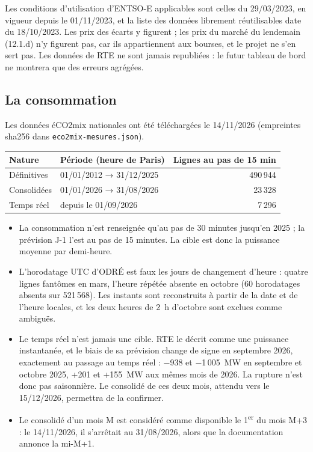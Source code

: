 \documentclass[11pt,a4paper]{article}
\begin{document}
Les conditions d'utilisation d'ENTSO-E applicables sont celles du 29/03/2023, en vigueur depuis le 01/11/2023, et la liste des données librement réutilisables date du 18/10/2023. Les prix des écarts y figurent ; les prix du marché du lendemain (12.1.d) n'y figurent pas, car ils appartiennent aux bourses, et le projet ne s'en sert pas. Les données de RTE ne sont jamais republiées : le futur tableau de bord ne montrera que des erreurs agrégées.

\subsection{La consommation}

Les données éCO2mix nationales ont été téléchargées le 14/11/2026 (empreintes sha256 dans \nolinkurl{eco2mix-mesures.json}).

\begin{table}[H]
\small
\begin{tabularx}{\linewidth}{lYr}
\toprule
\textbf{Nature} & \textbf{Période (heure de Paris)} & \textbf{Lignes au pas de 15 min} \\
\midrule
Définitives & 01/01/2012 → 31/12/2025 & 490\,944 \\
Consolidées & 01/01/2026 → 31/08/2026 & 23\,328 \\
Temps réel & depuis le 01/09/2026 & 7\,296 \\
\bottomrule
\end{tabularx}
\end{table}

\begin{itemize}
  \item La consommation n'est renseignée qu'au pas de 30 minutes jusqu'en 2025 ; la prévision J-1 l'est au pas de 15 minutes. La cible est donc la puissance moyenne par demi-heure.
  \item L'horodatage UTC d'ODRÉ est faux les jours de changement d'heure : quatre lignes fantômes en mars, l'heure répétée absente en octobre (60 horodatages absents sur 521\,568). Les instants sont reconstruits à partir de la date et de l'heure locales, et les deux heures de 2~h d'octobre sont exclues comme ambiguës.
  \item Le temps réel n'est jamais une cible. RTE le décrit comme une puissance instantanée, et le biais de sa prévision change de signe en septembre 2026, exactement au passage au temps réel : −938 et −1\,005~MW en septembre et octobre 2025, +201 et +155~MW aux mêmes mois de 2026. La rupture n'est donc pas saisonnière. Le consolidé de ces deux mois, attendu vers le 15/12/2026, permettra de la confirmer.
  \item Le consolidé d'un mois M est considéré comme disponible le 1\textsuperscript{er} du mois M+3 : le 14/11/2026, il s'arrêtait au 31/08/2026, alors que la documentation annonce la mi-M+1.
\end{itemize}
\end{document}
